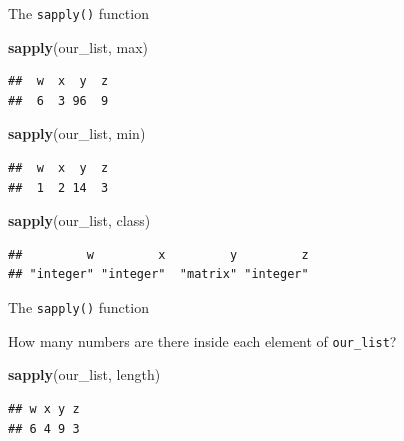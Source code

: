 \documentclass[ignorenonframetext,]{beamer}
\newenvironment{Shaded}{\begin{snugshade}}{\end{snugshade}}
\newcommand{\KeywordTok}[1]{\textcolor[rgb]{0.13,0.29,0.53}{\textbf{#1}}}
\newcommand{\NormalTok}[1]{#1}
\begin{document}
\begin{frame}[fragile]{The \texttt{sapply()} function}
\protect\hypertarget{the-sapply-function-2}{}

\begin{Shaded}
\begin{Highlighting}[]
\KeywordTok{sapply}\NormalTok{(our_list, max)}
\end{Highlighting}
\end{Shaded}

\begin{verbatim}
##  w  x  y  z 
##  6  3 96  9
\end{verbatim}

\begin{Shaded}
\begin{Highlighting}[]
\KeywordTok{sapply}\NormalTok{(our_list, min)}
\end{Highlighting}
\end{Shaded}

\begin{verbatim}
##  w  x  y  z 
##  1  2 14  3
\end{verbatim}

\begin{Shaded}
\begin{Highlighting}[]
\KeywordTok{sapply}\NormalTok{(our_list, class)}
\end{Highlighting}
\end{Shaded}

\begin{verbatim}
##         w         x         y         z 
## "integer" "integer"  "matrix" "integer"
\end{verbatim}

\end{frame}

\begin{frame}[fragile]{The \texttt{sapply()} function}
\protect\hypertarget{the-sapply-function-3}{}

How many numbers are there inside each element of \texttt{our\_list}?

\begin{Shaded}
\begin{Highlighting}[]
\KeywordTok{sapply}\NormalTok{(our_list, length)}
\end{Highlighting}
\end{Shaded}

\begin{verbatim}
## w x y z 
## 6 4 9 3
\end{verbatim}

\end{frame}
\end{document}
